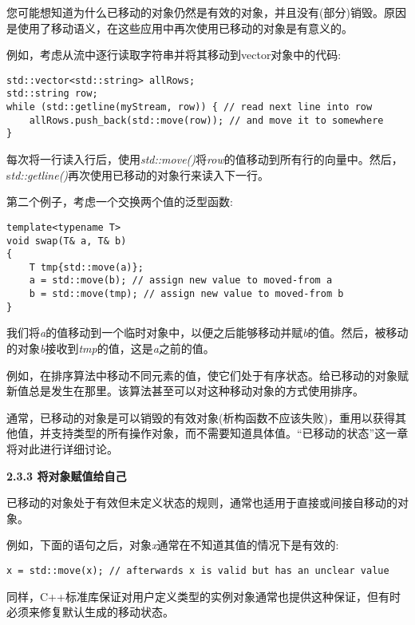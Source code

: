您可能想知道为什么已移动的对象仍然是有效的对象，并且没有(部分)销毁。原因是使用了移动语义，在这些应用中再次使用已移动的对象是有意义的。\par

例如，考虑从流中逐行读取字符串并将其移动到vector对象中的代码:\par

\begin{lstlisting}[caption={}]
std::vector<std::string> allRows;
std::string row;
while (std::getline(myStream, row)) { // read next line into row
	allRows.push_back(std::move(row)); // and move it to somewhere
}
\end{lstlisting}

每次将一行读入行后，使用\textit{std::move()}将\textit{row}的值移动到所有行的向量中。然后，s\textit{td::getline()}再次使用已移动的对象行来读入下一行。\par

第二个例子，考虑一个交换两个值的泛型函数:\par

\begin{lstlisting}[caption={}]
template<typename T>
void swap(T& a, T& b)
{
	T tmp{std::move(a)};
	a = std::move(b); // assign new value to moved-from a
	b = std::move(tmp); // assign new value to moved-from b
}
\end{lstlisting}

我们将\textit{a}的值移动到一个临时对象中，以便之后能够移动并赋\textit{b}的值。然后，被移动的对象\textit{b}接收到\textit{tmp}的值，这是\textit{a}之前的值。\par

例如，在排序算法中移动不同元素的值，使它们处于有序状态。给已移动的对象赋新值总是发生在那里。该算法甚至可以对这种移动对象的方式使用排序。\par

通常，已移动的对象是可以销毁的有效对象(析构函数不应该失败)，重用以获得其他值，并支持类型的所有操作对象，而不需要知道具体值。“已移动的状态”这一章将对此进行详细讨论。\par

\hspace*{\fill} \par %
\textbf{2.3.3 将对象赋值给自己}

已移动的对象处于有效但未定义状态的规则，通常也适用于直接或间接自移动的对象。\par

例如，下面的语句之后，对象\textit{x}通常在不知道其值的情况下是有效的:\par

\begin{lstlisting}[caption={}]
x = std::move(x); // afterwards x is valid but has an unclear value
\end{lstlisting}

同样，C++标准库保证对用户定义类型的实例对象通常也提供这种保证，但有时必须来修复默认生成的移动状态。\par


